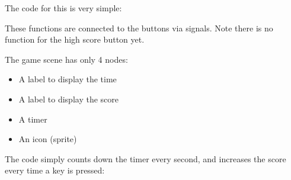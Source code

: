 \documentclass[letterpaper,10pt,english]{sphinxmanual}
\begin{document}
\sphinxAtStartPar
{}

\sphinxAtStartPar
The code for this is very simple:

\begin{sphinxVerbatim}[commandchars=\\\{\}]
 

 
\end{sphinxVerbatim}

\sphinxAtStartPar
These functions are connected to the buttons via signals.  Note there is no function for the high
score button yet.

\sphinxAtStartPar
The game scene has only 4 nodes:
\begin{itemize}
\item {} 
\sphinxAtStartPar
A label to display the time

\item {} 
\sphinxAtStartPar
A label to display the score

\item {} 
\sphinxAtStartPar
A timer

\item {} 
\sphinxAtStartPar
An icon (sprite)

\end{itemize}

\sphinxAtStartPar
{}

\sphinxAtStartPar
The code simply counts down the timer every second, and increases the score every time a key is pressed:
\end{document}

